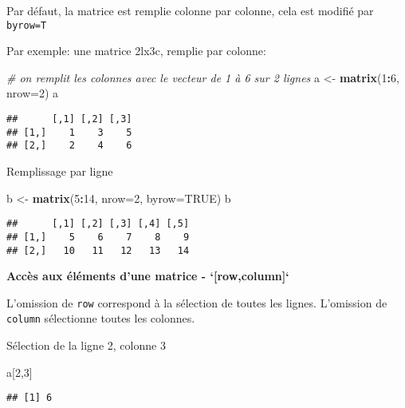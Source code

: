\documentclass[]{book}
\newenvironment{Shaded}{\begin{snugshade}}{\end{snugshade}}
\newcommand{\CommentTok}[1]{\textcolor[rgb]{0.56,0.35,0.01}{\textit{#1}}}
\newcommand{\DataTypeTok}[1]{\textcolor[rgb]{0.13,0.29,0.53}{#1}}
\newcommand{\DecValTok}[1]{\textcolor[rgb]{0.00,0.00,0.81}{#1}}
\newcommand{\KeywordTok}[1]{\textcolor[rgb]{0.13,0.29,0.53}{\textbf{#1}}}
\newcommand{\NormalTok}[1]{#1}
\newcommand{\OperatorTok}[1]{\textcolor[rgb]{0.81,0.36,0.00}{\textbf{#1}}}
\newcommand{\OtherTok}[1]{\textcolor[rgb]{0.56,0.35,0.01}{#1}}
\newcommand{\StringTok}[1]{\textcolor[rgb]{0.31,0.60,0.02}{#1}}
\begin{document}
Par défaut, la matrice est remplie colonne par colonne, cela est modifié par \texttt{byrow=T}

Par exemple: une matrice 2lx3c, remplie par colonne:

\begin{Shaded}
\begin{Highlighting}[]
\CommentTok{# on remplit les colonnes avec le vecteur de 1 à 6 sur 2 lignes}
\NormalTok{a <-}\StringTok{ }\KeywordTok{matrix}\NormalTok{(}\DecValTok{1}\OperatorTok{:}\DecValTok{6}\NormalTok{, }\DataTypeTok{nrow=}\DecValTok{2}\NormalTok{)}
\NormalTok{a}
\end{Highlighting}
\end{Shaded}

\begin{verbatim}
##      [,1] [,2] [,3]
## [1,]    1    3    5
## [2,]    2    4    6
\end{verbatim}

Remplissage par ligne

\begin{Shaded}
\begin{Highlighting}[]
\NormalTok{b <-}\StringTok{ }\KeywordTok{matrix}\NormalTok{(}\DecValTok{5}\OperatorTok{:}\DecValTok{14}\NormalTok{, }\DataTypeTok{nrow=}\DecValTok{2}\NormalTok{, }\DataTypeTok{byrow=}\OtherTok{TRUE}\NormalTok{)}
\NormalTok{b}
\end{Highlighting}
\end{Shaded}

\begin{verbatim}
##      [,1] [,2] [,3] [,4] [,5]
## [1,]    5    6    7    8    9
## [2,]   10   11   12   13   14
\end{verbatim}

\textbf{Accès aux éléments d'une matrice - `[row,column]`}

L'omission de \texttt{row} correspond à la sélection de toutes les lignes. L'omission de \texttt{column} sélectionne toutes les colonnes.

Sélection de la ligne 2, colonne 3

\begin{Shaded}
\begin{Highlighting}[]
\NormalTok{a[}\DecValTok{2}\NormalTok{,}\DecValTok{3}\NormalTok{]}
\end{Highlighting}
\end{Shaded}

\begin{verbatim}
## [1] 6
\end{verbatim}
\end{document}
